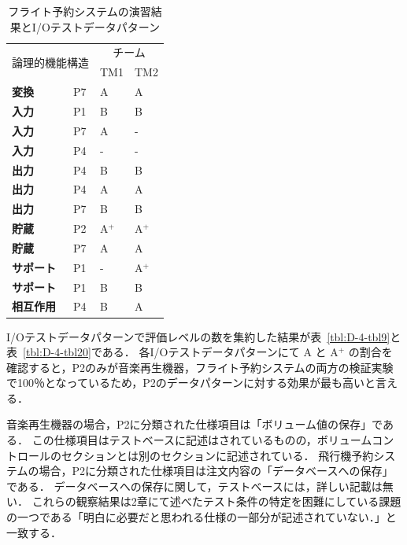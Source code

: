 \begin{table}[htbp]
  \centering
\caption{フライト予約システムの演習結果とI/Oテストデータパターン}
    \begin{tabular}{|l|l|l|l|}
    \hline
    \multicolumn{2}{|c|}{\multirow{2}[4]{*}{論理的機能構造}} & \multicolumn{2}{c|}{チーム} \bigstrut\\
\cline{3-4}    \multicolumn{2}{|c|}{} & TM1   & TM2 \bigstrut\\
    \hline
    \textbf{変換} & P7    & A     & A \bigstrut\\
    \hline
    \textbf{入力} & P1    & B     & B \bigstrut\\
    \hline
    \textbf{入力} & P7    & A     & - \bigstrut\\
    \hline
    \textbf{入力} & P4    & -     & - \bigstrut\\
    \hline
    \textbf{出力} & P4    & B     & B \bigstrut\\
    \hline
    \textbf{出力} & P4    & A     & A \bigstrut\\
    \hline
    \textbf{出力} & P7    & B     & B \bigstrut\\
    \hline
    \textbf{貯蔵} & P2    & A${}^\text{+}$    & A${}^\text{+}$ \bigstrut\\
    \hline
    \textbf{貯蔵} & P7    & A     & A \bigstrut\\
    \hline
    \textbf{サポート} & P1    & -     & A${}^\text{+}$ \bigstrut\\
    \hline
    \textbf{サポート} & P1    & B     & B \bigstrut\\
    \hline
    \textbf{相互作用} & P4    & B     & A \bigstrut\\
    \hline
    \end{tabular}%
\label{tbl:D-4-tbl8}%
\end{table}%

I/Oテストデータパターンで評価レベルの数を集約した結果が表~\ref{tbl:D-4-tbl9}と表~\ref{tbl:D-4-tbl20}である．
各I/Oテストデータパターンにて A と A${}^\text{+}$ の割合を確認すると，P2のみが音楽再生機器，フライト予約システムの両方の検証実験で100％となっているため，P2のデータパターンに対する効果が最も高いと言える．

音楽再生機器の場合，P2に分類された仕様項目は「ボリューム値の保存」である．
この仕様項目はテストベースに記述はされているものの，ボリュームコントロールのセクションとは別のセクションに記述されている．
飛行機予約システムの場合，P2に分類された仕様項目は注文内容の「データベースへの保存」である．
データベースへの保存に関して，テストベースには，詳しい記載は無い．
これらの観察結果は2章にて述べたテスト条件の特定を困難にしている課題の一つである「明白に必要だと思われる仕様の一部分が記述されていない．」と一致する．

